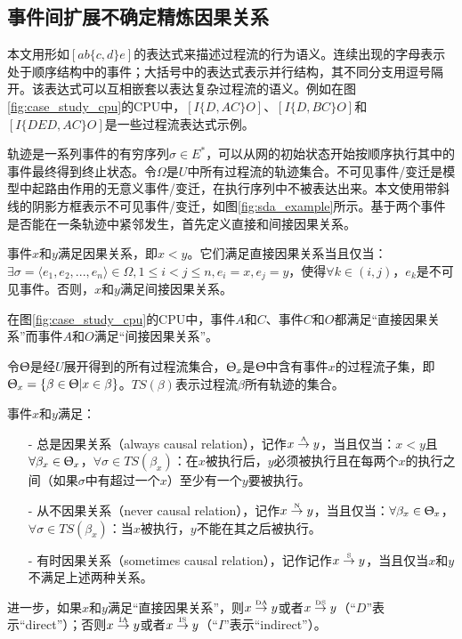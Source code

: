 \subsection{事件间扩展不确定精炼因果关系}\label{subsec:exroru_event_causal}
本文用形如$[ab\{c,d\}e]$的表达式来描述过程流的行为语义。连续出现的字母表示处于顺序结构中的事件；大括号中的表达式表示并行结构，其不同分支用逗号隔开。该表达式可以互相嵌套以表达复杂过程流的语义。例如在图\ref{fig:case_study_cpu}的CPU中，$[I\{D,AC\}O]$、$[I\{D,BC\}O]$和$[I\{DED,AC\}O]$是一些过程流表达式示例。

轨迹是一系列事件的有穷序列$\sigma\in E^{*}$，可以从网的初始状态开始按顺序执行其中的事件最终得到终止状态。令$\Omega$是$U$中所有过程流的轨迹集合。不可见事件/变迁是模型中起路由作用的无意义事件/变迁，在执行序列中不被表达出来\cite{wen2007mining}。本文使用带斜线的阴影方框表示不可见事件/变迁，如图\ref{fig:sda_example}所示。基于两个事件是否能在一条轨迹中紧邻发生，首先定义直接和间接因果关系。

\begin{definition}[直接和间接因果关系]\label{def:exroru_event_causal_direct}
事件$x$和$y$满足因果关系，即$x<y$。它们满足直接因果关系当且仅当：$\exists\sigma=\langle e_{1},e_{2},...,e_{n}\rangle\in\Omega,1\leq i<j\leq n,e_{i}=x,e_{j}=y$，使得$\forall k\in(i,j)$，$e_{k}$是不可见事件。否则，$x$和$y$满足间接因果关系。
\end{definition}

\begin{example}\label{ex:sda}
在图\ref{fig:case_study_cpu}的CPU中，事件$A$和$C$、事件$C$和$O$都满足“直接因果关系”而事件$A$和$O$满足“间接因果关系”。
\end{example}

令$\Uptheta$是经$U$展开得到的所有过程流集合，$\Uptheta_{x}$是$\Uptheta$中含有事件$x$的过程流子集，即$\Uptheta_{x}=\{\beta\in\Uptheta|x\in\beta\}$。$TS(\beta)$表示过程流$\beta$所有轨迹的集合。

\begin{definition}[事件间扩展不确定精炼因果关系]\label{def:exroru_event_causal}
事件$x$和$y$满足：
  \begin{itemize}
  	\item[-] 总是因果关系（always causal relation），记作$x\overset{\text{\tiny{A}}}{\rightarrow}y$，当且仅当：$x<y$且$\forall\beta_{x}\in\Uptheta_{x}$，$\forall\sigma\in TS(\beta_{x})$：在$x$被执行后，$y$必须被执行且在每两个$x$的执行之间（如果$\sigma$中有超过一个$x$）至少有一个$y$要被执行。
  	\item[-] 从不因果关系（never causal relation），记作$x\overset{\text{\tiny{N}}}{\rightarrow}y$，当且仅当：$\forall\beta_{x}\in\Uptheta_{x}$，$\forall\sigma\in TS(\beta_{x})$：当$x$被执行，$y$不能在其之后被执行。
  	\item[-] 有时因果关系（sometimes causal relation），记作记作$x\overset{\text{\tiny{S}}}{\rightarrow}y$，当且仅当$x$和$y$不满足上述两种关系。
  \end{itemize}
进一步，如果$x$和$y$满足“直接因果关系”，则$x\overset{\text{\tiny{DA}}}{\rightarrow}y$或者$x\overset{\text{\tiny{DS}}}{\rightarrow}y$（“$D$”表示“direct”）；否则$x\overset{\text{\tiny{IA}}}{\rightarrow}y$或者$x\overset{\text{\tiny{IS}}}{\rightarrow}y$（“$I$”表示“indirect”）。
\end{definition}

